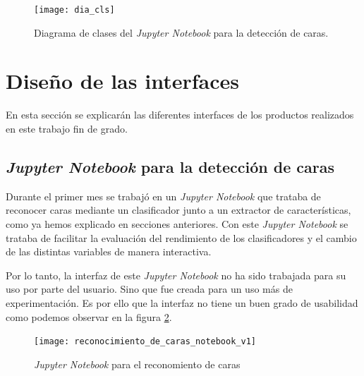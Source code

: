 \begin{figure}
\centering
\texttt{[image: dia\_cls]}
\caption{Diagrama de clases del \textit{Jupyter Notebook} para la detección de caras.}
\label{fig:C.4.6}
\end{figure}

\section{Diseño de las interfaces}

En esta sección se explicarán las diferentes interfaces de los productos realizados en este trabajo fin de grado.

\subsection{\textit{Jupyter Notebook} para la detección de caras}

Durante el primer mes se trabajó en un \textit{Jupyter Notebook} que trataba de reconocer caras mediante un clasificador junto a un extractor de características, como ya hemos explicado en secciones anteriores. Con este \textit{Jupyter Notebook} se trataba de facilitar la evaluación del rendimiento de los clasificadores y el cambio de las distintas variables de manera interactiva. 

Por lo tanto, la interfaz de este \textit{Jupyter Notebook} no ha sido trabajada para su uso por parte del usuario. Sino que fue creada para un uso más de experimentación. Es por ello que la interfaz no tiene un buen grado de usabilidad como podemos observar en la figura \ref{fig:C.5.1}.

\begin{figure}
\centering
\texttt{[image: reconocimiento\_de\_caras\_notebook\_v1]}
\caption{\textit{Jupyter Notebook} para el reconomiento de caras}
\label{fig:C.5.1}
\end{figure}


